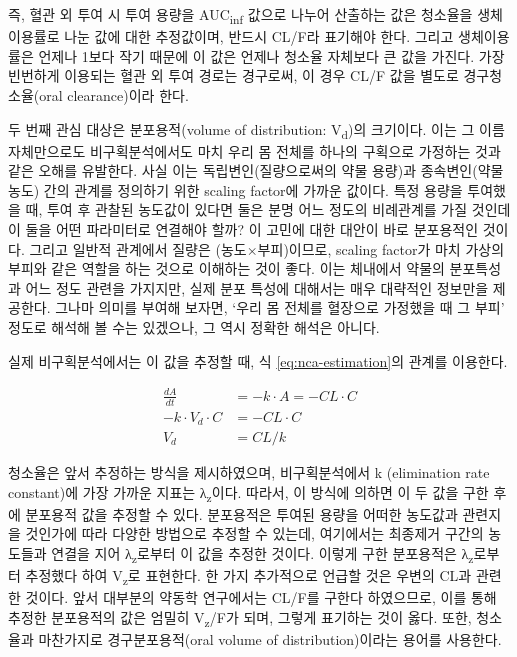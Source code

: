 \documentclass[
  11pt,
  krantz2, a4paper, twoside]{krantz}
\theoremstyle{definition}
\theoremstyle{definition}
\theoremstyle{definition}
\theoremstyle{definition}
\theoremstyle{remark}
\begin{document}
즉, 혈관 외 투여 시 투여 용량을 AUC\textsubscript{inf} 값으로 나누어 산출하는 값은 청소율을 생체이용률로 나눈 값에 대한 추정값이며, 반드시 CL/F라 표기해야 한다. 그리고 생체이용률은 언제나 1보다 작기 때문에 이 값은 언제나 청소율 자체보다 큰 값을 가진다. 가장 빈번하게 이용되는 혈관 외 투여 경로는 경구로써, 이 경우 CL/F 값을 별도로 경구청소율(oral clearance)이라 한다.

두 번째 관심 대상은 분포용적(volume of distribution: V\textsubscript{d})의 크기이다. 이는 그 이름 자체만으로도 비구획분석에서도 마치 우리 몸 전체를 하나의 구획으로 가정하는 것과 같은 오해를 유발한다. 사실 이는 독립변인(질량으로써의 약물 용량)과 종속변인(약물 농도) 간의 관계를 정의하기 위한 scaling factor에 가까운 값이다. 특정 용량을 투여했을 때, 투여 후 관찰된 농도값이 있다면 둘은 분명 어느 정도의 비례관계를 가질 것인데 이 둘을 어떤 파라미터로 연결해야 할까? 이 고민에 대한 대안이 바로 분포용적인 것이다. 그리고 일반적 관계에서 질량은 (농도×부피)이므로, scaling factor가 마치 가상의 부피와 같은 역할을 하는 것으로 이해하는 것이 좋다. 이는 체내에서 약물의 분포특성과 어느 정도 관련을 가지지만, 실제 분포 특성에 대해서는 매우 대략적인 정보만을 제공한다. 그나마 의미를 부여해 보자면, `우리 몸 전체를 혈장으로 가정했을 때 그 부피' 정도로 해석해 볼 수는 있겠으나, 그 역시 정확한 해석은 아니다.

실제 비구획분석에서는 이 값을 추정할 때, 식 \eqref{eq:nca-estimation}의 관계를 이용한다.

\begin{equation}
\begin{split}
\frac{{dA}}{{dt}} &= - k \cdot A = - CL \cdot C \\
- k \cdot V_{d} \cdot C &= - CL \cdot C \\
V_{d} &= CL/k
\end{split}
\label{eq:nca-estimation}
\end{equation}

청소율은 앞서 추정하는 방식을 제시하였으며, 비구획분석에서 k (elimination rate constant)에 가장 가까운 지표는 λ\textsubscript{z}이다. 따라서, 이 방식에 의하면 이 두 값을 구한 후에 분포용적 값을 추정할 수 있다. 분포용적은 투여된 용량을 어떠한 농도값과 관련지을 것인가에 따라 다양한 방법으로 추정할 수 있는데, 여기에서는 최종제거 구간의 농도들과 연결을 지어 λ\textsubscript{z}로부터 이 값을 추정한 것이다. 이렇게 구한 분포용적은 λ\textsubscript{z}로부터 추정했다 하여 V\textsubscript{z}로 표현한다. 한 가지 추가적으로 언급할 것은 우변의 CL과 관련한 것이다. 앞서 대부분의 약동학 연구에서는 CL/F를 구한다 하였으므로, 이를 통해 추정한 분포용적의 값은 엄밀히 V\textsubscript{z}/F가 되며, 그렇게 표기하는 것이 옳다. 또한, 청소율과 마찬가지로 경구분포용적(oral volume of distribution)이라는 용어를 사용한다.
\end{document}
